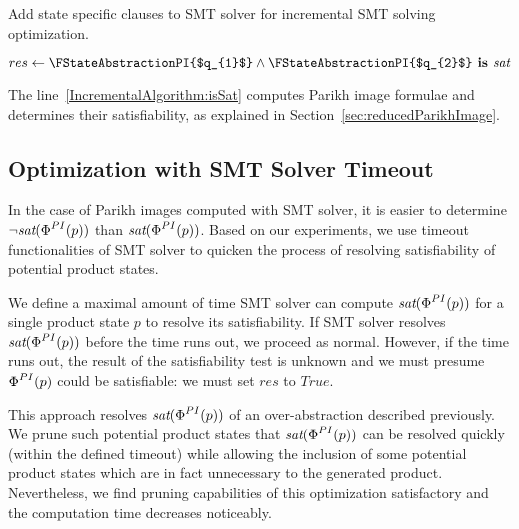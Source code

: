 \begin{algorithm}
\caption{Add state specific clauses to SMT solver for incremental SMT solving optimization.}\label{productConstructionParikhImageAlgorithmAddPersistentClauses}

\DontPrintSemicolon
\FSMTSolverPush{} \;
$res \gets \FStateAbstractionPI{$q_{1}$} \land \FStateAbstractionPI{$q_{2}$} \textbf{ is } \emph{sat} $ \;\label{IncrementalAlgorithm:isSat}
\FSMTSolverPop{} \;
\end{algorithm}

The line~\ref{IncrementalAlgorithm:isSat} computes Parikh image formulae and determines their satisfiability, as explained in Section~\ref{sec:reducedParikhImage}.


\subsection{Optimization with SMT Solver Timeout}

In the case of Parikh images computed with SMT solver, it is easier to determine $\neg \emph{sat}(\emph{$\Phi$}^{PI}(p))$ than $\emph{sat}(\emph{$\Phi$}^{PI}(p))$. Based on our experiments, we use timeout functionalities of SMT solver to quicken the process of resolving satisfiability of potential product states.

We define a maximal amount of time SMT solver can compute $\emph{sat}(\emph{$\Phi$}^{PI}(p))$ for a single product state $p$ to resolve its satisfiability. If SMT solver resolves $\emph{sat}(\emph{$\Phi$}^{PI}(p))$ before the time runs out, we proceed as normal. However, if the time runs out, the result of the satisfiability test is unknown and we must presume $\emph{$\Phi$}^{PI}(p)$ could be satisfiable: we must set $res$ to $True$.

This approach resolves $\emph{sat}(\emph{$\Phi$}^{PI}(p))$ of an over-abstraction described previously. We prune such potential product states that $\emph{sat}(\emph{$\Phi$}^{PI}(p))$ can be resolved quickly (within the defined timeout) while allowing the inclusion of some potential product states which are in fact unnecessary to the generated product. Nevertheless, we find pruning capabilities of this optimization satisfactory and the computation time decreases noticeably.

